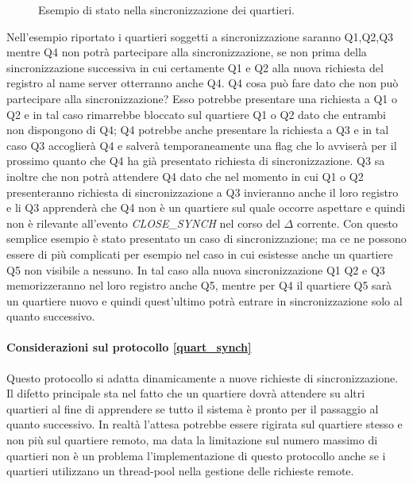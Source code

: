 \begin{figure}[H] %
\caption{Esempio di stato nella sincronizzazione dei quartieri.}
\label{fig:Esempio di stato nella sincronizzazione dei quartieri}
\end{figure}

Nell'esempio riportato i quartieri soggetti a sincronizzazione saranno Q1,Q2,Q3
mentre Q4 non potrà partecipare alla sincronizzazione, se non prima della
sincronizzazione successiva in cui certamente Q1 e Q2 alla nuova richiesta del
registro al name server otterranno anche Q4. Q4 cosa può fare dato che non può
partecipare alla sincronizzazione? Esso potrebbe presentare una richiesta a Q1
o Q2 e in tal caso rimarrebbe bloccato sul quartiere Q1 o Q2 dato che entrambi
non dispongono di Q4; Q4 potrebbe anche presentare la richiesta a Q3 e in tal
caso Q3 accoglierà Q4 e salverà temporaneamente una flag che lo avviserà per il
prossimo quanto che Q4 ha già presentato richiesta di sincronizzazione. Q3 sa
inoltre che non potrà attendere Q4 dato che nel momento in cui Q1 o Q2
presenteranno richiesta di sincronizzazione a Q3 invieranno anche il loro
registro e li Q3 apprenderà che Q4 non è un quartiere sul quale occorre
aspettare e quindi non è rilevante all'evento \textit{CLOSE\_SYNCH} nel corso
del $\Delta$ corrente. Con questo semplice esempio è stato presentato un caso
di sincronizzazione; ma ce ne possono essere di più complicati per esempio nel
caso in cui esistesse anche un quartiere Q5 non visibile a nessuno. In tal caso
alla nuova sincronizzazione Q1 Q2 e Q3 memorizzeranno nel loro registro anche
Q5, mentre per Q4 il quartiere Q5 sarà un quartiere nuovo e quindi quest'ultimo
potrà entrare in sincronizzazione solo al quanto successivo.

\paragraph{Considerazioni sul protocollo \ref{quart_synch}}
Questo protocollo si adatta dinamicamente a nuove richieste di sincronizzazione.
Il difetto principale sta nel fatto che un quartiere dovrà attendere su altri
quartieri al fine di apprendere se tutto il sistema è pronto per il passaggio
al quanto successivo. In realtà l'attesa potrebbe essere rigirata sul quartiere
stesso e non più sul quartiere remoto, ma data la limitazione sul numero
massimo di quartieri non è un problema l'implementazione di questo protocollo
anche se i quartieri utilizzano un thread-pool nella gestione delle richieste
remote.
